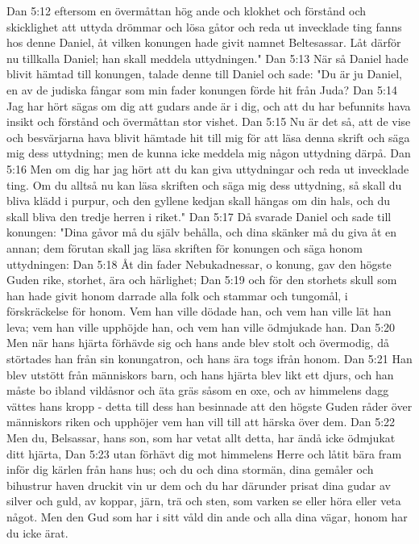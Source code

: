 Dan 5:12  eftersom en övermåttan hög ande och klokhet och förstånd och skicklighet att uttyda drömmar och lösa gåtor och reda ut invecklade ting fanns hos denne Daniel, åt vilken konungen hade givit namnet Beltesassar. Låt därför nu tillkalla Daniel; han skall meddela uttydningen."
Dan 5:13  När så Daniel hade blivit hämtad till konungen, talade denne till Daniel och sade: "Du är ju Daniel, en av de judiska fångar som min fader konungen förde hit från Juda?
Dan 5:14  Jag har hört sägas om dig att gudars ande är i dig, och att du har befunnits hava insikt och förstånd och övermåttan stor vishet.
Dan 5:15  Nu är det så, att de vise och besvärjarna hava blivit hämtade hit till mig för att läsa denna skrift och säga mig dess uttydning; men de kunna icke meddela mig någon uttydning därpå.
Dan 5:16  Men om dig har jag hört att du kan giva uttydningar och reda ut invecklade ting. Om du alltså nu kan läsa skriften och säga mig dess uttydning, så skall du bliva klädd i purpur, och den gyllene kedjan skall hängas om din hals, och du skall bliva den tredje herren i riket."
Dan 5:17  Då svarade Daniel och sade till konungen: "Dina gåvor må du själv behålla, och dina skänker må du giva åt en annan; dem förutan skall jag läsa skriften för konungen och säga honom uttydningen:
Dan 5:18  Åt din fader Nebukadnessar, o konung, gav den högste Guden rike, storhet, ära och härlighet;
Dan 5:19  och för den storhets skull som han hade givit honom darrade alla folk och stammar och tungomål, i förskräckelse för honom. Vem han ville dödade han, och vem han ville lät han leva; vem han ville upphöjde han, och vem han ville ödmjukade han.
Dan 5:20  Men när hans hjärta förhävde sig och hans ande blev stolt och övermodig, då störtades han från sin konungatron, och hans ära togs ifrån honom.
Dan 5:21  Han blev utstött från människors barn, och hans hjärta blev likt ett djurs, och han måste bo ibland vildåsnor och äta gräs såsom en oxe, och av himmelens dagg vättes hans kropp - detta till dess han besinnade att den högste Guden råder över människors riken och upphöjer vem han vill till att härska över dem.
Dan 5:22  Men du, Belsassar, hans son, som har vetat allt detta, har ändå icke ödmjukat ditt hjärta,
Dan 5:23  utan förhävt dig mot himmelens Herre och låtit bära fram inför dig kärlen från hans hus; och du och dina stormän, dina gemåler och bihustrur haven druckit vin ur dem och du har därunder prisat dina gudar av silver och guld, av koppar, järn, trä och sten, som varken se eller höra eller veta något. Men den Gud som har i sitt våld din ande och alla dina vägar, honom har du icke ärat.
